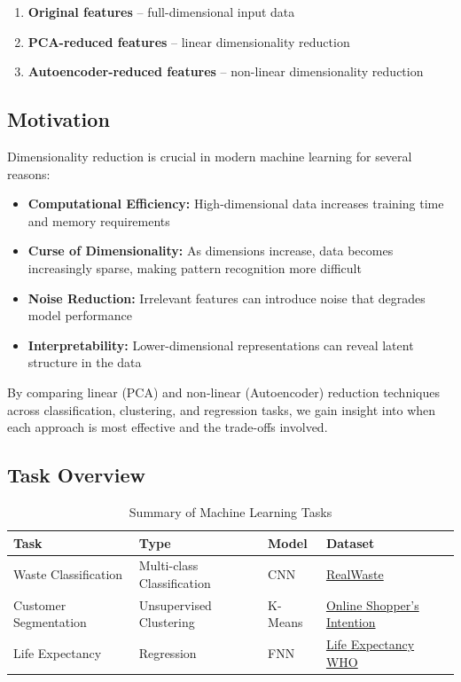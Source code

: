 \documentclass[11pt,a4paper]{article}
\begin{document}
\begin{enumerate}
    \item \textbf{Original features} -- full-dimensional input data
    \item \textbf{PCA-reduced features} -- linear dimensionality reduction
    \item \textbf{Autoencoder-reduced features} -- non-linear dimensionality reduction
\end{enumerate}

\subsection{Motivation}

Dimensionality reduction is crucial in modern machine learning for several reasons:

\begin{itemize}
    \item \textbf{Computational Efficiency:} High-dimensional data increases training time and memory requirements
    \item \textbf{Curse of Dimensionality:} As dimensions increase, data becomes increasingly sparse, making pattern recognition more difficult
    \item \textbf{Noise Reduction:} Irrelevant features can introduce noise that degrades model performance
    \item \textbf{Interpretability:} Lower-dimensional representations can reveal latent structure in the data
\end{itemize}

By comparing linear (PCA) and non-linear (Autoencoder) reduction techniques across classification, clustering, and regression tasks, we gain insight into when each approach is most effective and the trade-offs involved.

\subsection{Task Overview}

\begin{table}[H]
\centering
\caption{Summary of Machine Learning Tasks}
\begin{tabular}{@{}llll@{}}
\toprule
\textbf{Task} & \textbf{Type} & \textbf{Model} & \textbf{Dataset} \\
\midrule
Waste Classification & Multi-class Classification & CNN & \href{https://www.kaggle.com/datasets/joebeachcapital/realwaste}{RealWaste} \\
Customer Segmentation & Unsupervised Clustering & K-Means & \href{https://www.kaggle.com/datasets/henrysue/online-shoppers-intention}{Online Shopper's Intention} \\
Life Expectancy & Regression & FNN & \href{https://www.kaggle.com/datasets/kumarajarshi/life-expectancy-who}{Life Expectancy WHO} \\
\bottomrule
\end{tabular}
\end{table}
\end{document}
